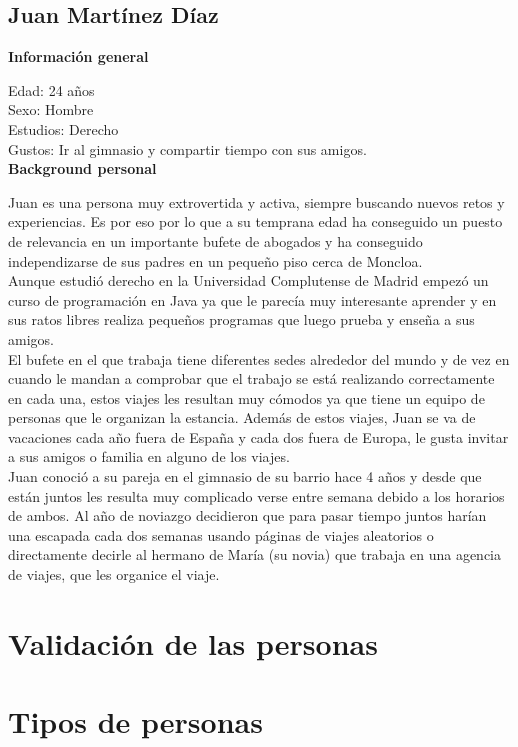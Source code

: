 \subsection{Juan Martínez Díaz}
\textbf{Información general}

Edad: 24 años \\
\indent Sexo: Hombre \\
\indent Estudios: Derecho \\
\indent Gustos: Ir al gimnasio y compartir tiempo con sus amigos. \\

\textbf{Background personal}

Juan es una persona muy extrovertida y activa, siempre buscando nuevos retos y experiencias. Es por eso por lo que a su temprana edad ha conseguido un puesto de relevancia en un importante bufete de abogados y ha conseguido independizarse de sus padres en un pequeño piso cerca de Moncloa. \\
Aunque estudió derecho en la Universidad Complutense de Madrid empezó un curso de programación en Java ya que le parecía muy interesante aprender y en sus ratos libres realiza pequeños programas que luego prueba y enseña a sus amigos. \\
El bufete en el que trabaja tiene diferentes sedes alrededor del mundo y de vez en cuando le mandan a comprobar que el trabajo se está realizando correctamente en cada una, estos viajes les resultan muy cómodos ya que tiene un equipo de personas que le organizan la estancia. Además de estos viajes, Juan se va de vacaciones cada año fuera de España y cada dos fuera de Europa, le gusta invitar a sus amigos o familia en alguno de los viajes. \\
Juan conoció a su pareja en el gimnasio de su barrio hace 4 años y desde que están juntos les resulta muy complicado verse entre semana debido a los horarios de ambos. Al año de noviazgo decidieron que para pasar tiempo juntos harían una escapada cada dos semanas usando páginas de viajes aleatorios o directamente decirle al hermano de María (su novia) que trabaja en una agencia de viajes, que les organice el viaje.

\section{Validación de las personas}
\section{Tipos de personas}